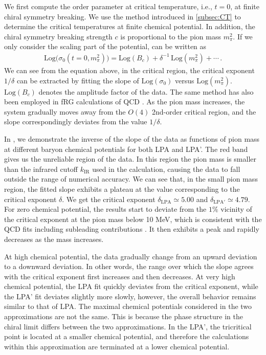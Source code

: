 \documentclass[aps,twocolumn,prd,superscriptaddress,nofootinbib,floatfix]{revtex4-2}
\def\Eq#1{\Cref{#1}}
\def\Fig#1{\Cref{#1}}
\begin{document}
We first compute the order parameter at critical temperature, i.e., $t=0$, at finite chiral symmetry breaking. We use the method introduced in \cref{subsec:CT} to determine the critical temperatures at finite chemical potential. In addition, the chiral symmetry breaking strength $c$ is proportional to the pion mass $m^2_\pi$. If we only consider the scaling part of the potential, \Eq{eq:delta} can be written as
%
\begin{align}
\mathrm{Log}\Big(\sigma_0(t=0,m^2_\pi)\Big)=\mathrm{Log}(B_c)+\delta^{-1}\,\mathrm{Log}(m^2_\pi)+\cdots\,.
\end{align}
%
We can see from the equation above, in the critical region, the critical exponent $1/\delta$ can be extracted by fitting the slope of $\mathrm{Log}(\sigma_0)$ versus $\mathrm{Log}(m^2_\pi)$. $\mathrm{Log}(B_c)$ denotes the amplitude factor of the data. The same method has also been employed in fRG calculations of QCD \cite{Braun:2023qak}. As the pion mass increases, the system gradually moves away from the $O(4)$ 2nd-order critical region, and the slope correspondingly deviates from the value $1/\delta$.

In \Fig{fig:h_scaling}, we demonstrate the inverse of the slope of the data as functions of pion mass at different baryon chemical potentials for both LPA and LPA'. The red band gives us the unreliable region of the data. In this region the pion mass is smaller than the infrared cutoff $k_{\mathrm{IR}}$ used in the calculation, causing the data to fall outside the range of numerical accuracy. We can see that, in the small pion mass region, the fitted slope exhibits a plateau at the value corresponding to the critical exponent $\delta$. We get the critical exponent $\delta_{\mathrm{LPA}}\simeq5.00$ and $\delta_{\mathrm{LPA}'}\simeq4.79$. For zero chemical potential, the results start to deviate from the $1\%$ vicinity of the critical exponent at the pion mass below 10 MeV, which is consistent with the QCD fits including subleading contributions \cite{Braun:2023qak}. It then exhibits a peak and rapidly decreases as the mass increases.

At high chemical potential, the data gradually change from an upward deviation to a downward deviation. In other words, the range over which the slope agrees with the critical exponent first increases and then decreases. At very high chemical potential, the LPA fit quickly deviates from the critical exponent, while the LPA' fit deviates slightly more slowly, however, the overall behavior remains similar to that of LPA. The maximal chemical potentials considered in the two approximations are not the same. This is because the phase structure in the chiral limit differs between the two approximations. In the LPA', the tricritical point is located at a smaller chemical potential, and therefore the calculations within this approximation are terminated at a lower chemical potential.
\end{document}
